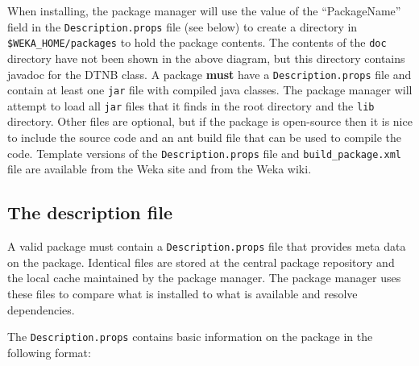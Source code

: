 When installing, the package manager will use the value of the
``PackageName'' field in the \texttt{Description.props} file (see below) to
create a directory in \verb=$WEKA_HOME/packages= to hold the package
contents. The contents of the \texttt{doc} directory have not been
shown in the above diagram, but this directory contains javadoc for
the DTNB class. A package \textbf{must} have a
\texttt{Description.props} file and contain at least one \texttt{jar}
file with compiled java classes.  The package manager will attempt to
load all \texttt{jar} files that it finds in the root directory and
the \texttt{lib} directory. Other files are optional, but if the
package is open-source then it is nice to include the source code and
an ant build file that can be used to compile the code. Template
versions of the \texttt{Description.props} file and
\verb=build_package.xml= file are available from the Weka site and
from the Weka wiki.

\subsection{The description file}

A valid package must contain a \texttt{Description.props} file that
provides meta data on the package. Identical files are stored at the
central package repository and the local cache maintained by the
package manager. The package manager uses these files to compare
what is installed to what is available and resolve dependencies.

The \texttt{Description.props} contains basic information on the
package in the following format:


